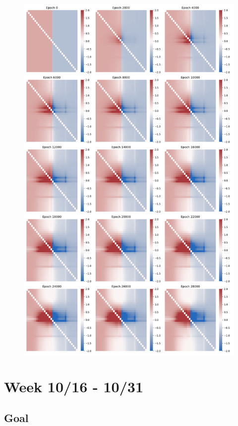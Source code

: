 \documentclass[12pt, a4paper]{article}
\begin{document}
\begin{figure}[H]
    \centering
    \includegraphics[width=\textwidth]{analysis/fig/0221_SIN2_bphcppt_weight_matrix_overtime.png} 
\end{figure}

\newpage

\section*{Week 10/16 - 10/31}

\subsection*{Goal}
\end{document}
